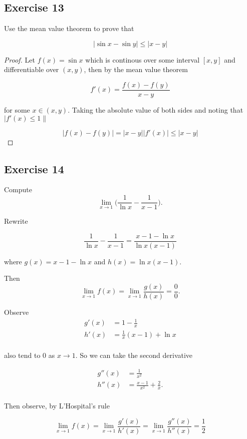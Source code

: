\documentclass{tufte-book}
\theoremstyle{mytheoremstyle}
\theoremstyle{mylemstyle}
\theoremstyle{mydefstyle}
\begin{document}
\subsection{Exercise 13}

Use the mean value theorem to prove that

\[ |\sin x - \sin y| \leq |x - y| \]

\begin{proof}

Let $f(x) = \sin x$ which is continous over some interval $[x,y]$ and differentiable over $(x,y)$, then by the mean value theorem

\[ f'(x) = \frac{f(x) - f(y)}{x-y} \]

for some $x \in (x,y)$.  Taking the absolute value of both sides and noting that $|f'(x) \leq 1\|$

\[ |f(x) - f(y)| = |x-y||f'(x)| \leq |x-y| \]

\end{proof}

\subsection{Exercise 14}
Compute
\[ \lim_{x \to 1} \big( \frac{1}{\ln x} - \frac{1}{x-1} \big). \]

Rewrite

\[ \frac{1}{\ln x} - \frac{1}{x-1} = \frac{x-1-\ln x}{\ln x (x-1)} \]

where $g(x) = x - 1 - \ln x$ and $h(x) = \ln x(x-1)$.

Then
\[ \lim_{x \to 1} f(x) = \lim_{x \to 1} \frac{g(x)}{h(x)} =\frac{0}{0}. \]

Observe
\begin{align*}
g'(x) &= 1- \frac{1}{x}\\
h'(x) &= \frac{1}{x}(x-1) + \ln x\\
\end{align*}

also tend to $0$ as $x \to 1$.  So we can take the second derivative

\begin{align*}
g''(x) &= \frac{1}{x^2} \\
h''(x) &= \frac{x-1}{x^2} + \frac{2}{x}.\\
\end{align*}

Then observe, by L'Hospital's rule

\[ \lim_{x \to 1} f(x) = \lim_{x \to 1} \frac{g'(x)}{h'(x)} = \lim_{x \to 1} \frac{g''(x)}{h''(x)} = \frac{1}{2} \]
\end{document}

